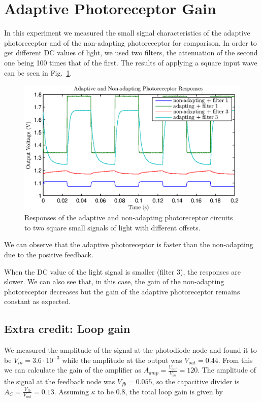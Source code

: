 

\newcommand{\reffig}[1]{Fig.~\ref{#1}}



\newpage

\section{Adaptive Photoreceptor Gain}

In this experiment we measured the small signal characteristics of the adaptive photoreceptor and of the non-adapting photoreceptor for comparison. In order to get different DC values of light, we used two filters, the attenuation of the second one being 100 times that of the first. The results of applying a square input wave can be seen in Fig.~\ref{fig:exp1}.

\begin{figure}[H]
	 \center
	 \includegraphics{exp1.eps}
	 \caption{Responses of the adaptive and non-adapting photoreceptor circuits to two square small signals of light with different offsets.}
	 \label{fig:exp1}
\end{figure}
We can observe that the adaptive photoreceptor is faster than the non-adapting due to the positive feedback. 

When the DC value of the light signal is smaller (filter 3), the responses are slower. We can also see that, in this case, the gain of the non-adapting photoreceptor decreases but the gain of the adaptive photoreceptor remains constant as expected. \\ 


\subsection{Extra credit: Loop gain}
We measured the amplitude of the signal at the photodiode node and found it to be \(V_{in}=3.6\cdot10^{-3}\) while the amplitude at the output was \(V_{out}=0.44\). From this we can calculate the gain of the amplifier as \(A_{amp}=\frac{V_{out}}{V_{in}}=120\).
The amplitude of the signal at the feedback node was \(V_{fb}=0.055\), so the capacitive divider is \(A_C=\frac{V_{fb}}{V_{out}}=0.13\). 
Assuming $\kappa$ to be 0.8, the total loop gain is given by


